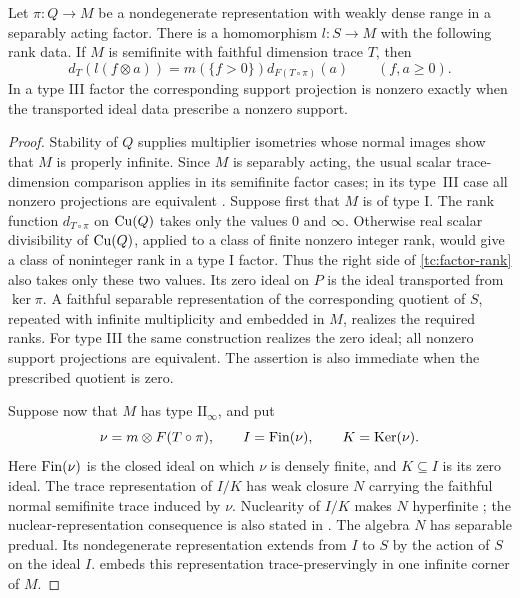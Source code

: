 \begin{lemma}\label{tc:factor-realization}
Let $\pi:Q\to M$ be a nondegenerate representation with weakly dense
range in a separably acting factor.  There is a homomorphism
$l:S\to M$ with the following rank data.  If $M$ is semifinite with
faithful dimension trace $T$, then
\begin{equation}\label{tc:factor-rank}
 d_T(l(f\otimes a))
   =m(\{f>0\})d_{F(T\circ\pi)}(a)
 \qquad(f,a\geq0).
\end{equation}
In a type III factor the corresponding support projection is nonzero
exactly when the transported ideal data prescribe a nonzero support.
\end{lemma}

\begin{proof}
Stability of $Q$ supplies multiplier isometries whose normal images
show that $M$ is properly infinite. Since $M$ is separably acting,
the usual scalar trace-dimension comparison applies in its semifinite
factor cases; in its type~III case all nonzero projections are
equivalent \cite[III.1.7.9--10 and III.1.3.7]{Blackadar}.  Suppose first that $M$ is of type
I.  The rank function $d_{T\circ\pi}$ on $\operatorname{Cu}(Q)$ takes only the values
$0$ and $\infty$.  Otherwise real scalar divisibility of $\operatorname{Cu}(Q)$,
applied to a class of finite nonzero integer rank, would give a class
of noninteger rank in a type I factor.  Thus the right side of
\eqref{tc:factor-rank} also takes only these two values.  Its zero ideal
on $P$ is the ideal transported from $\ker\pi$.  A faithful separable
representation of the corresponding quotient of $S$, repeated with
infinite multiplicity and embedded in $M$, realizes the required ranks.
For type III the same construction realizes the zero ideal; all
nonzero support projections are equivalent.  The assertion is also
immediate when the prescribed quotient is zero.

Suppose now that $M$ has type $\mathrm{II}_\infty$, and put
\[
 \nu=m\otimes F(T\circ\pi),\qquad I=\operatorname{Fin}(\nu),
 \qquad K=\operatorname{Ker}(\nu).
\]
Here $\operatorname{Fin}(\nu)$ is the closed ideal on which $\nu$ is densely finite,
and $K\subseteq I$ is its zero ideal.  The trace representation of
$I/K$ has weak closure $N$ carrying the faithful normal semifinite
trace induced by $\nu$.  Nuclearity of $I/K$ makes $N$ hyperfinite
\cite{Connes}; the nuclear-representation consequence is also stated
in \cite[Theorem~4.1 and the following paragraph]{ConnesReport}.
The algebra $N$ has separable predual.  Its nondegenerate
representation extends from $I$ to $S$ by the action of $S$ on the
ideal $I$.   embeds this representation
trace-preservingly in one infinite corner of $M$.


\end{proof}
